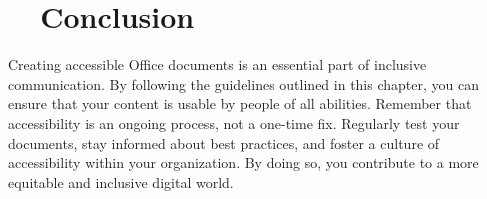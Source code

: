 \section{~~Conclusion}\label{ch15:sec:conclusion}
Creating accessible Office documents is an essential part of inclusive communication. By following the guidelines outlined in this chapter, you can ensure that your content is usable by people of all abilities. Remember that accessibility is an ongoing process, not a one-time fix. Regularly test your documents, stay informed about best practices, and foster a culture of accessibility within your organization. By doing so, you contribute to a more equitable and inclusive digital world.
